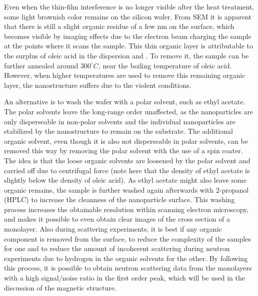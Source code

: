 \documentclass[\main/dresen_thesis.tex]{subfiles}
\begin{document}
  Even when the thin-film interference is no longer visible after the heat treatment, some light brownish color remains on the silicon wafer.
  From SEM it is apparent that there is still a slight organic residue of a few nm on the surface, which becomes visible by imaging effects due to the electron beam charging the sample at the points where it scans the sample.
  This thin organic layer is attributable to the surplus of oleic acid in the dispersion and .
  To remove it, the sample can be further annealed around $300 ^\circ C$, near the boiling temperature of oleic acid.
  However, when higher temperatures are used to remove this remaining organic layer, the nanostructure suffers due to the violent conditions.

  An alternative is to wash the wafer with a polar solvent, such as ethyl acetate.
  The polar solvents leave the long-range order unaffected, as the nanoparticles are only disperseable in non-polar solvents and the individual nanoparticles are stabilized by the nanostructure to remain on the substrate.
  The additional organic solvent, even though it is also not disperseable in polar solvents, can be removed this way by removing the polar solvent with the use of a spin coater.
  The idea is that the loose organic solvents are loosened by the polar solvent and carried off due to centrifugal force (note here that the density of ethyl acetate is slightly below the density of oleic acid).
  As ethyl acetate might also leave some organic remains, the sample is further washed again afterwards with 2-propanol (HPLC) to increase the cleanness of the nanoparticle surface.
  This washing process increases the obtainable resolution within scanning electron microscopy, and makes it possible to even obtain clear images of the cross section of a monolayer.
  Also during scattering experiments, it is best if any organic component is removed from the surface, to reduce the complexity of the samples for one and to reduce the amount of incoherent scattering during neutron experiments due to hydrogen in the organic solvents for the other.
  By following this process, it is possible to obtain neutron scattering data from the monolayers  with a high signal/noise ratio in the first order peak, which will be used in the discussion of the magnetic structure.
\end{document}
